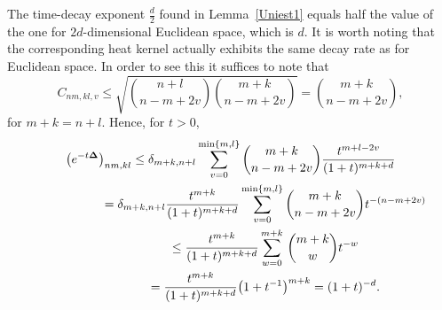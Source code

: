 \documentclass[10pt,a4paper]{amsart}
\begin{document}
\begin{remark}
The time-decay exponent $\frac d2$ found in  Lemma~\ref{Uniest1} equals half
the value of the one for $2d$-dimensional Euclidean space, which
is $d$. It is worth noting that the corresponding heat kernel actually exhibits the
same decay rate as for Euclidean space. In order to see this it
suf\/f\/ices to note that
\[
C_{nm,kl,v}\leq\sqrt{{n+l\choose n-m+2v}{m+k\choose n-m+2v}}=
{m+k\choose n-m+2v} ,
\]
for $m+k=n+l$. Hence, for $t>0$,
\begin{gather*}
\left(e^{-t{\bf{\Delta}}}\right)_{nm,kl} \leq
\delta_{m+k,n+l}\sum_{v=0}^{\min\{m,l\}} {m+k\choose n-m+2v}
 \frac{t^{m+l-2v}}{(1+t)^{m+k+d}}\\
\hphantom{\left(e^{-t{\bf{\Delta}}}\right)_{nm,kl}}{}
= \delta_{m+k,n+l}\frac{t^{m+k}}{(1+t)^{m+k+d}}
\sum_{v=0}^{\min\{m,l\}} {m+k\choose n-m+2v}
 t^{-(n-m+2v)}\\
\hphantom{\left(e^{-t{\bf{\Delta}}}\right)_{nm,kl}}{}
 \leq \frac{t^{m+k}}{(1+t)^{m+k+d}}
\sum_{w=0}^{m+k}\,{m+k\choose w} t^{-w}\\
\hphantom{\left(e^{-t{\bf{\Delta}}}\right)_{nm,kl}}{}
= \frac{t^{m+k}}{(1+t)^{m+k+d}}\big(1+t^{-1}\big)^{m+k} = (1+t)^{-d} .
\end{gather*}
\end{remark}
\end{document}
